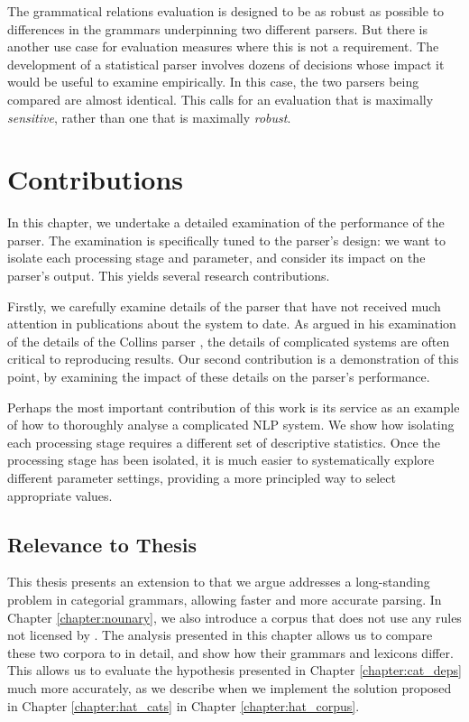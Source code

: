 The grammatical relations evaluation is designed to be as robust as possible to differences in the grammars underpinning two different parsers. But there is another use case for evaluation measures where this is not a requirement. The development of a statistical parser involves dozens of decisions whose impact it would be useful to examine empirically. In this case, the two parsers being compared are almost identical. This calls for an evaluation that is maximally \emph{sensitive}, rather than one that is maximally \emph{robust}.

\section{Contributions}

In this chapter, we undertake a detailed examination of the performance of the \candc parser. The examination is specifically tuned to the parser's design: we want to isolate each processing stage and parameter, and consider its impact on the parser's output. This yields several research contributions.

Firstly, we carefully examine details of the \candc parser that have not received much attention in publications about the system to date. As \citet{bikel} argued in his examination of the details of the Collins parser \citet{collins}, the details of complicated systems are often critical to reproducing results. Our second contribution is a demonstration of this point, by examining the impact of these details on the parser's performance.

Perhaps the most important contribution of this work is its service as an example of how to thoroughly analyse a complicated NLP system. We show how isolating each processing stage requires a different set of descriptive statistics. Once the processing stage has been isolated, it is much easier to systematically explore different parameter settings, providing a more principled way to select appropriate values.

\subsection{Relevance to Thesis}

This thesis presents an extension to \ccg that we argue addresses a long-standing problem in categorial grammars, allowing faster and more accurate \ccg parsing. In Chapter \ref{chapter:nounary}, we also introduce a \ccg corpus that does not use any rules not licensed by \ccg. The analysis presented in this chapter allows us to compare these two corpora to \ccgbank in detail, and show how their grammars and lexicons differ. This allows us to evaluate the hypothesis presented in Chapter \ref{chapter:cat_deps} much more accurately, as we describe when we implement the solution proposed in Chapter \ref{chapter:hat_cats} in Chapter \ref{chapter:hat_corpus}.


